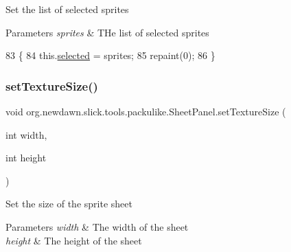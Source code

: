 Set the list of selected sprites


\begin{DoxyParams}{Parameters}
{\em sprites} & T\+He list of selected sprites \\
\hline
\end{DoxyParams}

\begin{DoxyCode}
83                                                 \{
84         this.\mbox{\hyperlink{classorg_1_1newdawn_1_1slick_1_1tools_1_1packulike_1_1_sheet_panel_a307218d49f6dfea97933ccf80ab293aa}{selected}} = sprites;
85         repaint(0);
86     \}
\end{DoxyCode}
\mbox{\label{classorg_1_1newdawn_1_1slick_1_1tools_1_1packulike_1_1_sheet_panel_a46f4e2aa8cc13578241c6df33b0fa852}} 
\subsubsection{\texorpdfstring{set\+Texture\+Size()}{setTextureSize()}}
{\footnotesize\ttfamily void org.\+newdawn.\+slick.\+tools.\+packulike.\+Sheet\+Panel.\+set\+Texture\+Size (\begin{DoxyParamCaption}\item[{int}]{width,  }\item[{int}]{height }\end{DoxyParamCaption})\hspace{0.3cm}{\ttfamily [inline]}}

Set the size of the sprite sheet


\begin{DoxyParams}{Parameters}
{\em width} & The width of the sheet \\
\hline
{\em height} & The height of the sheet \\
\hline
\end{DoxyParams}

